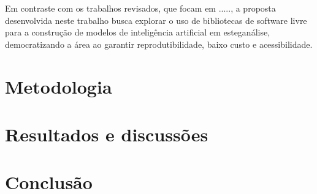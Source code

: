 \documentclass[12pt]{article}
\begin{document}
Em contraste com os trabalhos revisados, que focam em ....., a proposta
desenvolvida neste trabalho busca explorar o uso de bibliotecas de software
livre para a construção de modelos de inteligência artificial em esteganálise,
democratizando a área ao garantir reprodutibilidade, baixo custo e
acessibilidade.

\section{Metodologia}

\section{Resultados e discussões}

\section{Conclusão}\label{sec:figs}






\end{document}
